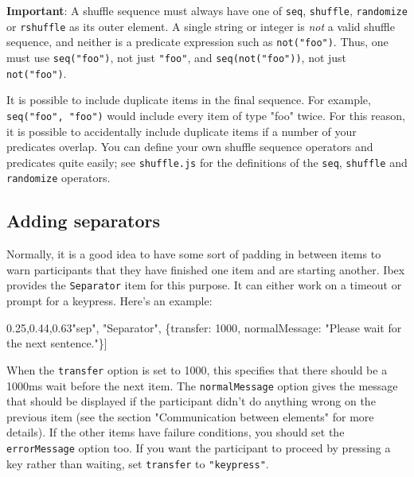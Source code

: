\documentclass[
]{article}
\newenvironment{Shaded}{}{}
\newcommand{\DataTypeTok}[1]{\textcolor[rgb]{0.56,0.13,0.00}{#1}}
\newcommand{\DecValTok}[1]{\textcolor[rgb]{0.25,0.63,0.44}{#1}}
\newcommand{\NormalTok}[1]{#1}
\newcommand{\OperatorTok}[1]{\textcolor[rgb]{0.40,0.40,0.40}{#1}}
\newcommand{\StringTok}[1]{\textcolor[rgb]{0.25,0.44,0.63}{#1}}
\begin{document}
\textbf{Important}: A shuffle sequence must always have one of
\texttt{seq}, \texttt{shuffle}, \texttt{randomize} or \texttt{rshuffle}
as its outer element. A single string or integer is \emph{not} a valid
shuffle sequence, and neither is a predicate expression such as
\texttt{not("foo")}. Thus, one must use \texttt{seq("foo")}, not just
\texttt{"foo"}, and \texttt{seq(not("foo"))}, not just
\texttt{not("foo")}.

It is possible to include duplicate items in the final sequence. For
example, \texttt{seq("foo",\ "foo")} would include every item of type
"foo" twice. For this reason, it is possible to accidentally include
duplicate items if a number of your predicates overlap. You can define
your own shuffle sequence operators and predicates quite easily; see
\texttt{shuffle.js} for the definitions of the \texttt{seq},
\texttt{shuffle} and \texttt{randomize} operators.

\hypertarget{adding-separators}{%
\subsection{Adding separators}\label{adding-separators}}

Normally, it is a good idea to have some sort of padding in between
items to warn participants that they have finished one item and are
starting another. Ibex provides the \texttt{Separator} item for this
purpose. It can either work on a timeout or prompt for a keypress.
Here's an example:

\begin{Shaded}
\begin{Highlighting}[]
\NormalTok{    [}\StringTok{"sep"}\OperatorTok{,} \StringTok{"Separator"}\OperatorTok{,}\NormalTok{ \{}\DataTypeTok{transfer}\OperatorTok{:} \DecValTok{1000}\OperatorTok{,} \DataTypeTok{normalMessage}\OperatorTok{:} \StringTok{"Please wait for the next sentence."}\NormalTok{\}]}
\end{Highlighting}
\end{Shaded}

When the \texttt{transfer} option is set to 1000, this specifies that
there should be a 1000ms wait before the next item. The
\texttt{normalMessage} option gives the message that should be displayed
if the participant didn't do anything wrong on the previous item (see
the section "Communication between elements" for more details). If the
other items have failure conditions, you should set the
\texttt{errorMessage} option too. If you want the participant to proceed
by pressing a key rather than waiting, set \texttt{transfer} to
\texttt{"keypress"}.
\end{document}
